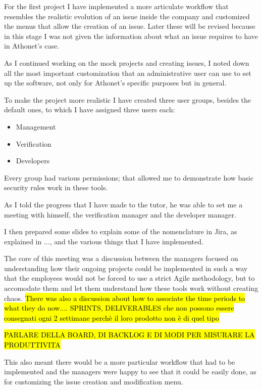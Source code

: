 	For the first project I have implemented a more articulate workflow that resembles the realistic evolution of an issue inside the company and customized the menus that allow the creation of an issue.
	Later these will be revised because in this stage I was not given the information about what an issue requires to have in Athonet's case. 
	
	As I continued working on the mock projects and creating issues, I noted down all the most important customization that an administrative user can use to set up the software, not only for Athonet's specific purposes but in general.
	
	To make the project more realistic I have created three user groups, besides the default ones, to which I have assigned three users each:
	\begin{itemize}
		\item Management
		\item Verification
		\item Developers
	\end{itemize}
	
	Every group had various permissions; that allowed me to demonstrate how basic security rules work in these tools.
	
	As I told the progress that I have made to the tutor, he was able to set me a meeting with himself, the verification manager and the developer manager.
	
	I then prepared some slides to explain some of the nomenclature in Jira, as explained in ..., and the various things that I have implemented.
	
	The core of this meeting was a discussion between the managers focused on understanding how their ongoing projects could be implemented in such a way that the employees would not be forced to use a strict Agile methodology, but to accomodate them and let them understand how these tools work without creating chaos.
	\hl{There was also a discussion about how to associate the time periods to what they do now.... SPRINTS, DELIVERABLES che non possono essere consegnati ogni 2 settimane perchè il loro prodotto non è di quel tipo}
	
	\hl{PARLARE DELLA BOARD, DI BACKLOG E DI MODI PER MISURARE LA PRODUTTIVITA}
	
	This also meant there would be a more particular workflow that had to be implemented and the managers were happy to see that it could be easily done, as for customizing the issue creation and modification menu.
	
